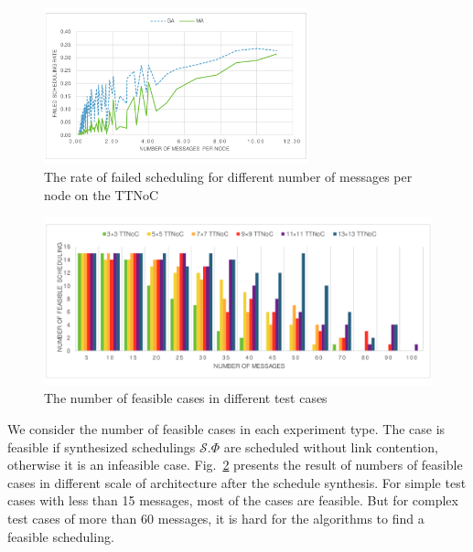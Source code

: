 \documentclass[10pt,journal]{IEEEtran}
\newcommand{\calS}{\mathcal{S}}
\theoremstyle{remark}
\begin{document}
\begin{figure}[!t]
	\centering
	\includegraphics[width=3in]{picture/dencity}
	\caption{The rate of failed scheduling for different number of messages per node on the TTNoC}
	\label{f:dencity}
\end{figure}
\begin{figure}[!t]
	\centering
	\includegraphics[width=3.5 in]{picture/feasible_case}
	\caption{The number of feasible cases in different test cases}
	\label{f:feasible}
\end{figure}

We consider the number of feasible cases in each experiment type.
The case is feasible if synthesized schedulings $\calS.\Phi$ are scheduled without link contention,
 otherwise it is an infeasible case.
Fig.~\ref{f:feasible} presents the result of numbers of feasible cases in different scale of architecture after the schedule synthesis.
For simple test cases with less than 15 messages,
 most of the cases are feasible.
But for complex test cases of more than 60 messages, it is hard for the algorithms to find a feasible scheduling.
\end{document}
